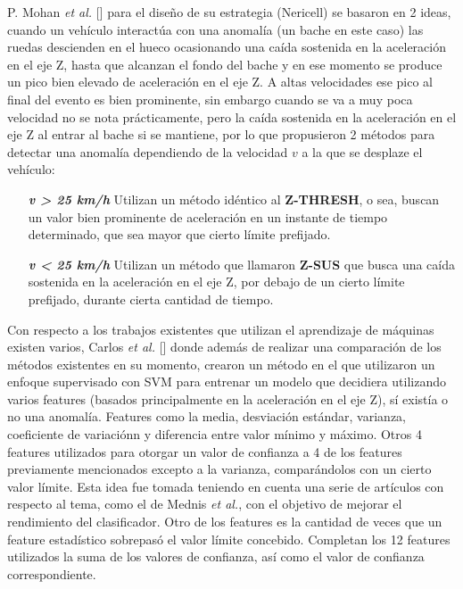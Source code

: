 P. Mohan {\it et al.} [] para el diseño de su estrategia (Nericell) se basaron en 2 ideas, cuando un vehículo interactúa con una
anomalía (un bache en este caso) las ruedas descienden en el hueco ocasionando una caída sostenida en la aceleración en el eje Z,
hasta que alcanzan el fondo del bache y en ese momento se produce un pico bien elevado de aceleración en el eje Z. A altas velocidades
ese pico al final del evento es bien prominente, sin embargo cuando se va a muy poca velocidad no se nota prácticamente, pero la caída
sostenida en la aceleración en el eje Z al entrar al bache si se mantiene, por lo que propusieron 2 métodos para detectar una anomalía
dependiendo de la velocidad $v$ a la que se desplaze el vehículo:\\

\begin{enumerate}
	\item [ \textbf {\it v > 25 km/h} ] Utilizan un método idéntico al \textbf {Z-THRESH}, o sea, buscan un valor bien prominente de
		aceleración en un instante de tiempo determinado, que sea mayor que cierto límite prefijado.\\
	\item [ \textbf {\it v < 25 km/h} ] Utilizan un método que llamaron \textbf {Z-SUS} que busca una caída sostenida en la aceleración
		en el eje Z, por debajo de un cierto límite prefijado, durante cierta cantidad de tiempo.\\
\end{enumerate}

Con respecto a los trabajos existentes que utilizan el aprendizaje de máquinas existen varios, Carlos {\it et al.} [] donde además de realizar 
una comparación de los métodos existentes en su momento, crearon un método en el que utilizaron un enfoque supervisado con SVM para entrenar 
un modelo que decidiera utilizando varios features (basados principalmente en la aceleración en el eje Z), sí existía o no una anomalía. Features
como la media, desviación estándar, varianza, coeficiente de variaciónn y diferencia entre valor mínimo y máximo. Otros 4 features utilizados para
otorgar un valor de confianza a 4 de los features previamente mencionados excepto a la varianza, comparándolos con un cierto valor límite. Esta idea
fue tomada teniendo en cuenta una serie de artículos con respecto al tema, como el de Mednis {\it et al.}, con el objetivo de mejorar el rendimiento
del clasificador. Otro de los features es la cantidad de veces que un feature estadístico sobrepasó el valor límite concebido. Completan los 12 features
utilizados la suma de los valores de confianza, así como el valor de confianza correspondiente.\\

